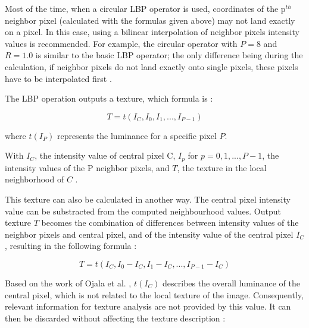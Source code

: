 \noindent Most of the time, when a circular LBP operator is used, coordinates of the p$^{th}$ neighbor pixel (calculated with the formulas given above) may not land exactly on a pixel. In this case, using a bilinear interpolation of neighbor pixels intensity values is recommended. For example, the circular operator with $ P = 8 $ and $ R = 1.0 $ is similar to the basic LBP operator; the only difference being during the calculation, if neighbor pixels do not land exactly onto single pixels, these pixels have to be interpolated first \cite{GAN08}.
\newline

\noindent The LBP operation outputs a texture, which formula is \cite{GAN08}:
\newline

\begin{equation}
   T = t(I_C, I_0, I_1, ..., I_{P-1})
\end{equation}

\noindent where $t(I_P)$ represents the luminance for a specific pixel $P$.

\vspace{\baselineskip}
\noindent With $ I_C $, the intensity value of central pixel C, $ I_p $ for $ p = 0, 1, ..., P-1 $, the intensity values of the P neighbor pixels, and $ T $, the texture in the local neighborhood of $ C $ \cite{GAN08}.
\newline

\noindent This texture can also be calculated in another way. The central pixel intensity value can be substracted from the computed neighbourhood values. Output texture $ T $ becomes the combination of differences between intensity values of the neighbor pixels and central pixel, and of the intensity value of the central pixel $ I_C $, resulting in the following formula \cite{GAN08}:
\newline

\begin{equation}
   T = t(I_C, I_0 - I_C, I_1 - I_C, ..., I_{P-1} - I_C)
\end{equation}

\vspace{\baselineskip}
\noindent Based on the work of Ojala et al. \cite{OJA96}, $ t(I_C) $ describes the overall luminance of the central pixel, which is not related to the local texture of the image. Consequently, relevant information for texture analysis are not provided by this value. It can then be discarded without affecting the texture description \cite{GAN08}:
\newline

